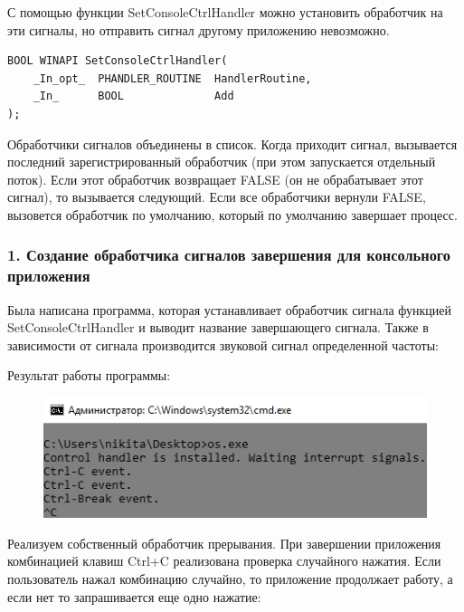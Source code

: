 \documentclass[14pt,a4paper,report]{report}
\begin{document}
С помощью функции SetConsoleCtrlHandler можно установить обработчик на эти сигналы, но отправить сигнал другому приложению невозможно.

\begin{verbatim}
BOOL WINAPI SetConsoleCtrlHandler(
    _In_opt_  PHANDLER_ROUTINE  HandlerRoutine,
    _In_      BOOL              Add
);
\end{verbatim}

Обработчики сигналов объединены в список. Когда приходит сигнал, вызывается последний зарегистрированный обработчик (при этом запускается отдельный поток). Если этот обработчик возвращает FALSE (он не обрабатывает этот сигнал), то вызывается следующий. Если все обработчики вернули FALSE, вызовется обработчик по умолчанию, который по умолчанию завершает процесс.

\subsubsection{1. Создание обработчика сигналов завершения для консольного приложения}

Была написана программа, которая устанавливает обработчик сигнала функцией SetConsoleCtrlHandler и выводит название завершающего сигнала. Также в зависимости от сигнала производится звуковой сигнал определенной частоты: 



Результат работы программы:

\begin{figure}[h!]
	\centering
	\includegraphics[scale = 0.9]{images/p4_1.png}
	
	\caption{}
	\label{image:24}
\end{figure}

Реализуем собственный обработчик прерывания. При завершении приложения комбинацией клавиш Ctrl+C реализована проверка случайного нажатия. Если пользователь нажал комбинацию случайно, то приложение продолжает работу, а если нет то запрашивается еще одно нажатие:


\end{document}

